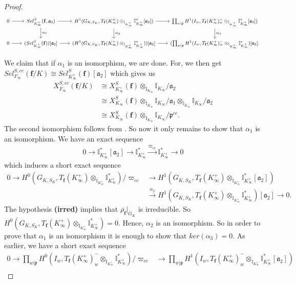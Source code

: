 \documentclass[reqno,10pt]{amsart}
\newcommand{\I}{\mathbb{I}}
\newcommand{\f}{\mathbf{f}}
\newcommand{\ma}{\mathfrak{a}}
\newcommand{\p}{\mathfrak{p}}
\newcommand{\kinf}{K_\infty}
\newcommand{\kip}{K_\infty^+}
\newcommand{\ikinf}{\I_{K_\infty}}
\newcommand{\ikip}{\I_{K_\infty^+}}
\theoremstyle{plain}
\theoremstyle{definition}
\begin{document}
\begin{proof}
    $$
    \begin{tikzcd}[sep=1.8em, font=\small]
	0 \arrow[r] & 
    Sel_{\kip}^S(\f,\ma_2) \arrow[r] \arrow[d,"\alpha_1"] &
	  H^1(G_{K,S_K},T_\f(\kip) \otimes_{\ikip} \ikip^*[\ma_2]) \arrow[r,'] \arrow[d,"\alpha_2"] &
	\prod_{w|\p} H^1(I_w,T_\f(\kip)^-_w \otimes_{\ikip} \ikip^*[\ma_2]) \arrow[d,"\alpha_3"] 
	\\
	0 \arrow[r] &
	(Sel^S_{\kip}(\f))[\ma_2] \arrow[r] &
	(H^1(G_{K,S_K},T_\f(\kip) \otimes_{\ikip} \ikip^*))[\ma_2] \arrow[r] &
	(\prod_{w|\p} H^1(I_w,T_\f(\kip)^-_w \otimes_{\ikip} \ikip^*)[\ma_2].
    \end{tikzcd}
    $$

    We claim that if $\alpha_1$ is an isomorphism, we are done. For, we then get $Sel_{F_\infty}^{S,cc}(\f/K) \cong Sel_{\kip}^S(\f)[\ma_2]$ which gives us
    \begin{align*}
        X_{F_\infty}^{S,cc}(\f/K) & \cong X_{\kip}^S(\f) \otimes_{\ikinf} \ikinf/\ma_2 \\
        & \cong X_{\kinf}^S(\f) \otimes_{\ikinf} \ikinf/\ma_1 \otimes_{\ikinf} \ikinf/\ma_2 \\
        & \cong X_{\kinf}^S(\f) \otimes_{\ikinf} \ikinf/\mathfrak{p}^{cc}.
    \end{align*}
    The second isomorphism follows from \cite[Corollary 17]{Wan}. So now it only remains to show that $\alpha_1$ is an isomorphism. We have an exact sequence
    \begin{align*}
        0 \rightarrow \ikip^*[\ma_2] \rightarrow \ikip^* \xrightarrow{\varpi_{cc}} \ikip^* \rightarrow 0
    \end{align*}
    which induces a short exact sequence
    \begin{align*}
        0 \rightarrow H^0(G_{K,S_K},T_\f(\kip) \otimes_{\ikip} \ikip^*)/\varpi_{cc} & \rightarrow H^1(G_{K,S_K},T_\f(\kip) \otimes_{\ikip} \ikip^*[\ma_2]) \\
        & \xrightarrow{\alpha_2} H^1(G_{K,S_K},T_\f(\kip) \otimes_{\ikip} \ikip^*)[\ma_2] \rightarrow 0.
    \end{align*}
    The hypothesis \textbf{(irred)} implies that $\overline{\rho_\f}|_{G_K}$ is irreducible. So $H^0(G_{K,S_K},T_\f(\kip) \otimes_{\ikip} \ikip^*) = 0$. Hence, $\alpha_2$ is an isomorphism. So in order to prove that $\alpha_1$ is an isomorphism it is enough to show that $ker(\alpha_3) = 0$. As earlier, we have a short exact sequence
    \begin{align*}
        0 \rightarrow \prod_{w|\p} H^0(I_w,T_\f(\kip)^-_w \otimes_{\ikip} \ikip^*)/\varpi_{cc} & \rightarrow \prod_{w|\p} H^1(I_w,T_\f(\kip)^-_w \otimes_{\ikip} \ikip^*[\ma_2]) \\

\end{align*}
\end{proof}
\end{document}
